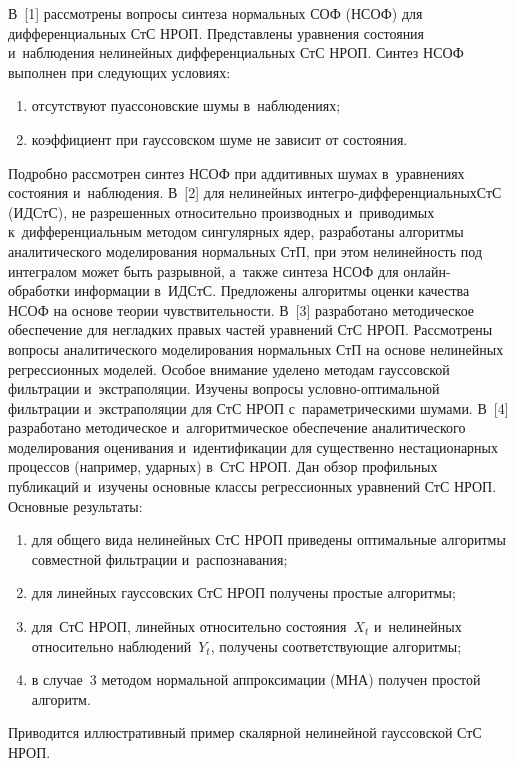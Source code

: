 \begin{multicols}{2}
В~[1] рассмотрены вопросы синтеза нормальных СОФ (НСОФ) для дифференциальных 
СтС НРОП. Представлены уравнения состояния 
и~наблюдения нелинейных дифференциальных СтС НРОП. Синтез НСОФ выполнен при следующих условиях: 
\begin{enumerate}[(1)]
\item отсутствуют 
пуассоновские шумы в~наблюдениях; 
\item коэффициент при гауссовском шуме не зависит 
от состояния.
\end{enumerate}
 Подробно рассмотрен синтез НСОФ при аддитивных шумах в~уравнениях 
состояния и~наблюдения.
%
В~[2] для нелинейных интег\-ро-диф\-фе\-рен\-ци\-аль\-ных\linebreak СтС (ИДСтС), не 
разрешенных относительно производных и~приводимых к~дифференциальным методом 
сингулярных ядер, разработаны алгоритмы аналитического моделирования нормальных 
СтП, при этом нелинейность под интегралом может быть разрывной, а~также синтеза 
НСОФ для он\-лайн-об\-ра\-бот\-ки информации в~ИДСтС. Предложены алгоритмы оценки 
качества НСОФ на основе теории чувствительности.
%
В~[3] разработано методическое обеспечение для негладких правых частей уравнений 
СтС НРОП. Рассмотрены вопросы аналитического моделирования нормальных СтП на 
основе нелинейных регрессионных моделей. Особое внимание уделено методам 
гауссовской фильтрации и~экстраполяции.\linebreak
 Изуче\-ны вопросы услов\-но-оп\-ти\-маль\-ной 
фильт\-ра\-ции и~экстраполяции для СтС НРОП с~па\-ра\-мет\-ри\-че\-ски\-ми шумами.
В~[4] разработано методическое и~алгоритмическое обеспечение аналитического 
моделирования оценивания и~\mbox{идентификации} для существенно нестационарных 
процессов (например, ударных) в~СтС НРОП. Дан обзор профильных пуб\-ли\-ка\-ций 
и~изучены основные классы регрессионных уравнений СтС НРОП. Основные ре\-зуль\-таты: 
\begin{enumerate}[(1)]
\item для общего вида нелинейных СтС НРОП приведены оптимальные алгоритмы 
совместной фильтрации и~распознавания; 
\item для линейных гауссовских СтС НРОП 
получены простые алгоритмы; 
\item для~СтС НРОП, линейных относительно состояния~$X_t$ 
и~нелинейных относительно наблюдений~$Y_t$, получены соответствующие  
алгоритмы; 
\item в случае~3 методом нормальной аппроксимации (МНА) получен простой 
алгоритм.
\end{enumerate}
 Приводится иллюстративный пример скалярной нелинейной гауссовской СтС 
НРОП.


\end{multicols}
